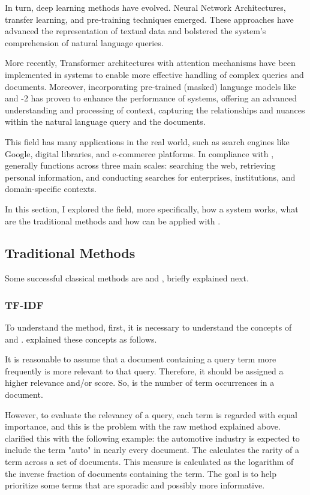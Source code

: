 In turn, deep learning methods have evolved. Neural Network Architectures, transfer learning, and pre-training techniques emerged. These approaches have advanced the representation of textual data and bolstered the {\ir} system's comprehension of natural language queries.

More recently, Transformer architectures with attention mechanisms have been implemented in {\ir} systems to enable more effective handling of complex queries and documents. Moreover, incorporating pre-trained (masked) language models like {\bert} and {\gpt}-2 has proven to enhance the performance of {\ir} systems, offering an advanced understanding and processing of context, capturing the relationships and nuances within the natural language query and the documents.

This field has many applications in the real world, such as search engines like Google, digital libraries, and e-commerce platforms. In compliance with \citet{p_m_efficient_2021}, {\ir} generally functions across three main scales: searching the web, retrieving personal information, and conducting searches for enterprises, institutions, and domain-specific contexts.

In this section, I explored the {\ir} field, more specifically, how a {\ir} system works, what are the traditional methods and how {\ir} can be applied with {\nlp}.


\subsection{Traditional Methods}

Some successful classical methods are {\tfidf} and {\bm}, briefly explained next.

\subsubsection{TF-IDF}

To understand the {\tfidf} method, first, it is necessary to understand the concepts of {\tf} and {\idf}. \citet{manning_introduction_2009} explained these concepts as follows.

It is reasonable to assume that a document containing a query term more frequently is more relevant to that query. Therefore, it should be assigned a higher relevance and/or score. So, {\tf} is the number of term occurrences in a document.

However, to evaluate the relevancy of a query, each term is regarded with equal importance, and this is the problem with the raw method explained above. \citet{manning_introduction_2009} clarified this with the following example: the automotive industry is expected to include the term "auto" in nearly every document. The  {\idf} calculates the rarity of a term across a set of documents. This measure is calculated as the logarithm of the inverse fraction of documents containing the term. The goal is to help prioritize some terms that are sporadic and possibly more informative.

